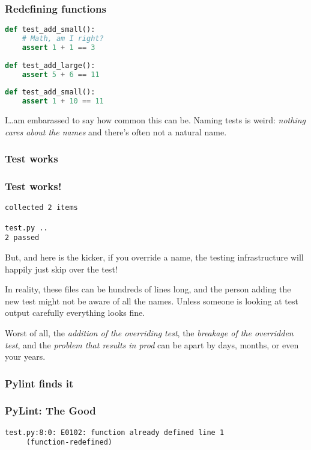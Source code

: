 \begin{frame}[fragile]
\frametitle{Redefining functions}

\begin{lstlisting}[language=Python]
def test_add_small():
    # Math, am I right?
    assert 1 + 1 == 3
    
def test_add_large():
    assert 5 + 6 == 11
    
def test_add_small():
    assert 1 + 10 == 11
\end{lstlisting}

\end{frame}

I\ldots am embarassed to say how common this can be. Naming tests is
weird: \emph{nothing cares about the names} and there's often not a
natural name.

\hypertarget{test-works}{%
\subsubsection{Test works}\label{test-works}}

\begin{frame}[fragile]
\frametitle{Test works!}

\begin{lstlisting}
collected 2 items                                                                         

test.py .. 
2 passed 
\end{lstlisting}

\end{frame}

But, and here is the kicker, if you override a name, the testing
infrastructure will happily just skip over the test!

In reality, these files can be hundreds of lines long, and the person
adding the new test might not be aware of all the names. Unless someone
is looking at test output carefully everything looks fine.

Worst of all, the \emph{addition of the overriding test}, the
\emph{breakage of the overridden test}, and the \emph{problem that
results in prod} can be apart by days, months, or even your years.

\hypertarget{pylint-finds-it}{%
\subsubsection{Pylint finds it}\label{pylint-finds-it}}

\begin{frame}[fragile]
\frametitle{PyLint: The Good}

\begin{lstlisting}
test.py:8:0: E0102: function already defined line 1
     (function-redefined)
\end{lstlisting}

\end{frame}

